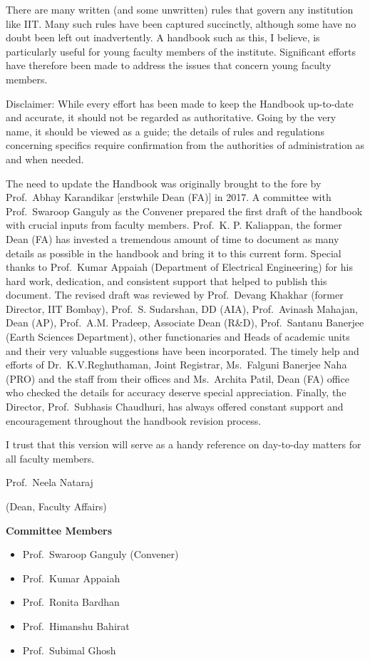 \documentclass[
  10pt,
  a5paper,
  10pt,
  openany]{amsbook}
\providecommand{\tightlist}{%
  \setlength{\itemsep}{0pt}\setlength{\parskip}{0pt}}
\begin{document}
There are many written (and some unwritten) rules that govern any
institution like IIT. Many such rules have been captured succinctly,
although some have no doubt been left out inadvertently. A handbook such
as this, I believe, is particularly useful for young faculty members of
the institute. Significant efforts have therefore been made to address
the issues that concern young faculty members.

Disclaimer: While every effort has been made to keep the Handbook
up-to-date and accurate, it should not be regarded as authoritative.
Going by the very name, it should be viewed as a guide; the details of
rules and regulations concerning specifics require confirmation from the
authorities of administration as and when needed.

The need to update the Handbook was originally brought to the fore by
Prof.~Abhay Karandikar {[}erstwhile Dean (FA){]} in 2017. A committee
with Prof.~Swaroop Ganguly as the Convener prepared the first draft of
the handbook with crucial inputs from faculty members. Prof.~K. P.
Kaliappan, the former Dean (FA) has invested a tremendous amount of time
to document as many details as possible in the handbook and bring it to
this current form. Special thanks to Prof.~Kumar Appaiah (Department of
Electrical Engineering) for his hard work, dedication, and consistent
support that helped to publish this document. The revised draft was
reviewed by Prof.~Devang Khakhar (former Director, IIT Bombay), Prof.~S.
Sudarshan, DD (AIA), Prof.~Avinash Mahajan, Dean (AP), Prof.~A.M.
Pradeep, Associate Dean (R\&D), Prof.~Santanu Banerjee (Earth Sciences
Department), other functionaries and Heads of academic units and their
very valuable suggestions have been incorporated. The timely help and
efforts of Dr.~K.V.Reghuthaman, Joint Registrar, Ms.~Falguni Banerjee
Naha (PRO) and the staff from their offices and Ms.~Archita Patil, Dean
(FA) office who checked the details for accuracy deserve special
appreciation. Finally, the Director, Prof.~Subhasis Chaudhuri, has
always offered constant support and encouragement throughout the
handbook revision process.

I trust that this version will serve as a handy reference on day-to-day
matters for all faculty members.

Prof.~Neela Nataraj

(Dean, Faculty Affairs)

\textbf{Committee Members}

\begin{itemize}
\tightlist
\item
  Prof.~Swaroop Ganguly (Convener)
\item
  Prof.~Kumar Appaiah
\item
  Prof.~Ronita Bardhan
\item
  Prof.~Himanshu Bahirat
\item
  Prof.~Subimal Ghosh
\end{itemize}
\end{document}

